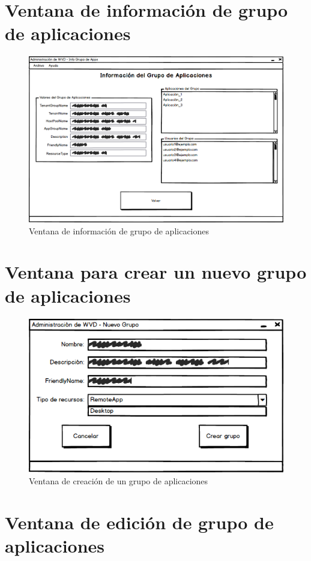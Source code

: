 \clearpage

\section{Ventana de información de grupo de aplicaciones}

\begin{figure}[h]
  \centering
  \includegraphics[width=0.9\linewidth]{figures/images/bocetos/info_grupo.png}
  \caption{Ventana de información de grupo de aplicaciones}
  \label{fig:b_infogrupo}
\end{figure}


\section{Ventana para crear un nuevo grupo de aplicaciones}

\begin{figure}[h]
  \centering
  \includegraphics[width=0.7\linewidth]{figures/images/bocetos/nuevo_grupo.png}
  \caption{Ventana de creación de un grupo de aplicaciones}
  \label{fig:b_nuevogrupo}
\end{figure}

\clearpage


\section{Ventana de edición de grupo de aplicaciones}

